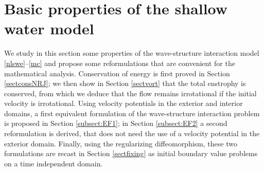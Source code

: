 \documentclass[10pt]{amsart}
\theoremstyle{definition}
\begin{document}
\section{Basic properties of the shallow water model}\label{sect:BP}
We study in this section some properties of the wave-structure interaction model \eqref{nlswe}--\eqref{mc} and
propose some reformulations that are convenient for the mathematical analysis.
Conservation of energy is first proved in Section \ref{sectconsNRJ};
we then show in Section \ref{sectvort} that the total enstrophy is conserved,
from which we deduce that the flow remains irrotational if the initial velocity is irrotational.
Using velocity potentials in the exterior and interior domains,
a first equivalent formulation of the wave-structure interaction problem is proposed in Section \ref{subsect:EF1};
in Section \ref{subsect:EF2} a second reformulation is derived, that does not need the use of a velocity potential in the exterior domain.
Finally, using the regularizing diffeomorphism, these two formulations are recast in Section \ref{sectfixing}
as initial boundary value problems on a time independent domain.
\end{document}
